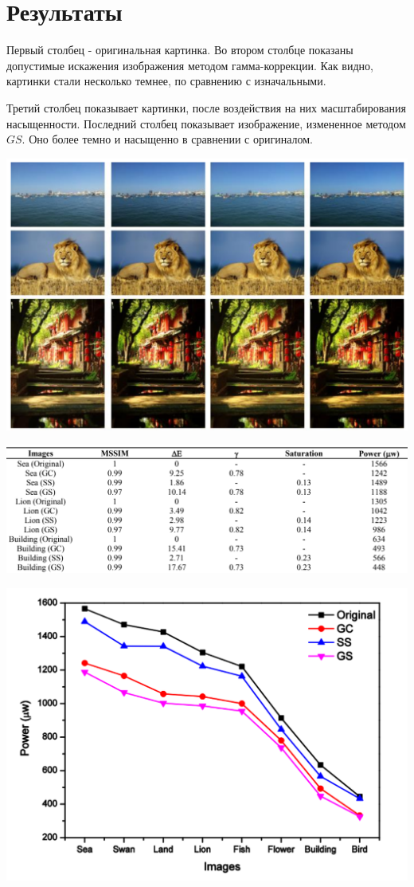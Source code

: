 \documentclass[a4paper, 12pt]{article}
\begin{document}
\newpage
\section*{Результаты}

    Первый столбец - оригинальная картинка. Во втором столбце показаны допустимые искажения изображения методом гамма-коррекции. Как видно, картинки стали несколько темнее, по сравнению с изначальными.
    
    Третий столбец показывает картинки, после воздействия на них масштабирования насыщенности. Последний столбец показывает изображение, измененное методом $GS$. Оно более темно и насыщенно в сравнении с оригиналом. 
    
    \includegraphics[scale=0.6]{9}
    
    \includegraphics[scale=0.5]{10}
    
    \includegraphics[scale=0.6]{11}
\end{document}
